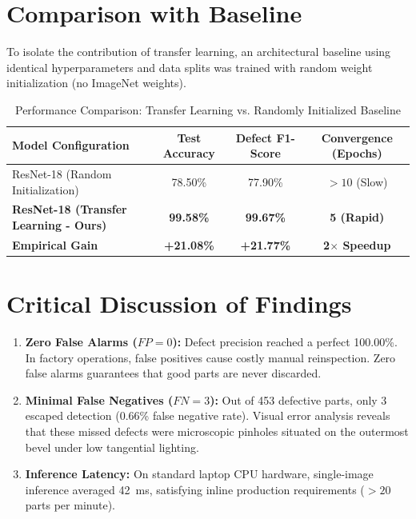 \documentclass[12pt,a4paper]{report}
\begin{document}
\section{Comparison with Baseline}
To isolate the contribution of transfer learning, an architectural baseline using identical hyperparameters and data splits was trained with random weight initialization (no ImageNet weights).

\begin{table}[h]
\centering
\caption{Performance Comparison: Transfer Learning vs. Randomly Initialized Baseline}
\label{tab:baseline_comp}
\begin{tabular}{lccc}
\toprule
\textbf{Model Configuration} & \textbf{Test Accuracy} & \textbf{Defect F1-Score} & \textbf{Convergence (Epochs)} \\
\midrule
ResNet-18 (Random Initialization) & 78.50\% & 77.90\% & $>10$ (Slow) \\
\textbf{ResNet-18 (Transfer Learning - Ours)} & \textbf{99.58\%} & \textbf{99.67\%} & \textbf{5 (Rapid)} \\
\midrule
\textbf{Empirical Gain} & \textbf{+21.08\%} & \textbf{+21.77\%} & \textbf{2$\times$ Speedup} \\
\bottomrule
\end{tabular}
\end{table}

\section{Critical Discussion of Findings}
\begin{enumerate}
    \item \textbf{Zero False Alarms ($FP = 0$):} Defect precision reached a perfect 100.00\%. In factory operations, false positives cause costly manual reinspection. Zero false alarms guarantees that good parts are never discarded.
    \item \textbf{Minimal False Negatives ($FN = 3$):} Out of 453 defective parts, only 3 escaped detection (0.66\% false negative rate). Visual error analysis reveals that these missed defects were microscopic pinholes situated on the outermost bevel under low tangential lighting.
    \item \textbf{Inference Latency:} On standard laptop CPU hardware, single-image inference averaged 42~ms, satisfying inline production requirements ($>20$ parts per minute).
\end{enumerate}

\end{document}
